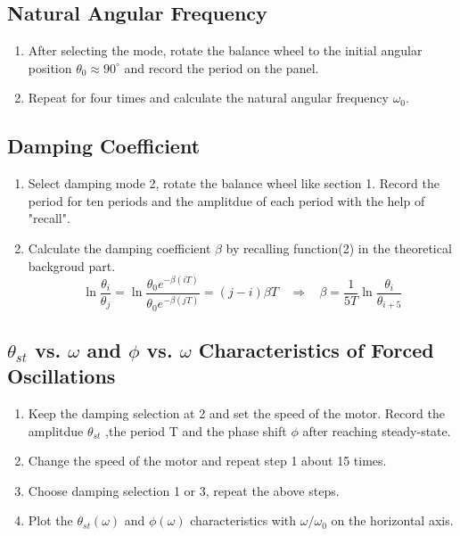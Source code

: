 \documentclass[12pt,a4paper]{article}
\begin{document}
\subsection{Natural Angular Frequency}
\begin{enumerate}[1.]
    \item After selecting the mode, rotate the balance wheel to the initial angular position
    $\theta_0\approx 90^{\circ}$ and record the period on the panel.
    \item Repeat for four times and calculate the natural angular frequency $\omega_0$.
\end{enumerate}
\subsection{Damping Coefficient}
\begin{enumerate}[1.]
    \item Select damping mode 2, rotate the balance wheel like section 1. Record the period for
ten periods and the amplitdue of each period with the help of "recall".
    \item Calculate the damping coefficient $\beta$ by recalling function(2) in the theoretical backgroud part.
    \begin{equation}
        \ln{\frac{\theta_i}{\theta_j}}=\ln{\frac{\theta_0e^{-\beta(iT)}}{\theta_0e^{-\beta(jT)}}}=(j-i)\beta T \ \ \ \ \Rightarrow \ \ \ \ \beta=\frac{1}{5T}\ln{\frac{\theta_i}{\theta_{i+5}}}
        \nonumber
    \end{equation}
\end{enumerate}
\subsection{$\theta_{st}$ vs. $\omega$ and $\phi$ vs. $\omega$ Characteristics of Forced Oscillations}
\begin{enumerate}[1.]
    \item Keep the damping selection at 2 and set the speed of the motor. Record the amplitdue $\theta_{st}$
    ,the period T and the phase shift $\phi$ after reaching steady-state.
    \item Change the speed of the motor and repeat step 1 about 15 times.
    \item Choose damping selection 1 or 3, repeat the above steps.
    \item Plot the $\theta_{st}(\omega)$ and $\phi(\omega)$ characteristics with $\omega/\omega_{0}$ on the horizontal axis.
\end{enumerate}
\end{document}

